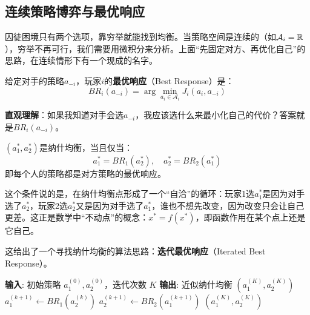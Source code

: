 \subsection{连续策略博弈与最优响应}

囚徒困境只有两个选项，靠穷举就能找到均衡。当策略空间是连续的（如$\mathcal{A}_i = \mathbb{R}$），穷举不再可行，我们需要用微积分来分析。上面“先固定对方、再优化自己”的思路，在连续情形下有一个现成的名字。

\begin{definition}[最优响应]
给定对手的策略$a_{-i}$，玩家$i$的\textbf{最优响应}（Best Response）是：
\begin{equation}
    BR_i(a_{-i}) = \arg\min_{a_i \in \mathcal{A}_i} J_i(a_i, a_{-i})
\end{equation}

\textbf{直观理解}：如果我知道对手会选$a_{-i}$，我应该选什么来最小化自己的代价？答案就是$BR_i(a_{-i})$。
\end{definition}

\begin{proposition}[纳什均衡的不动点特征]
$(a_1^*, a_2^*)$是纳什均衡，当且仅当：
\begin{equation}
    a_1^* = BR_1(a_2^*), \quad a_2^* = BR_2(a_1^*)
\end{equation}
即每个人的策略都是对方策略的最优响应。
\end{proposition}

\begin{remark}[不动点的直观含义]
这个条件说的是，在纳什均衡点形成了一个“自洽”的循环：玩家1选$a_1^*$是因为对手选了$a_2^*$，玩家2选$a_2^*$又是因为对手选了$a_1^*$，谁也不想先改变，因为改变只会让自己更差。这正是数学中“不动点”的概念：$x^* = f(x^*)$，即函数作用在某个点上还是它自己。
\end{remark}

这给出了一个寻找纳什均衡的算法思路：\textbf{迭代最优响应}（Iterated Best Response）。

\begin{algorithm}
\caption{迭代最优响应（伪代码）}
\begin{algorithmic}[1]
\State \textbf{输入}: 初始策略 $a_1^{(0)}, a_2^{(0)}$，迭代次数 $K$
\State \textbf{输出}: 近似纳什均衡 $(a_1^{(K)}, a_2^{(K)})$
    \State $a_1^{(k+1)} \leftarrow BR_1(a_2^{(k)})$ 
    \State $a_2^{(k+1)} \leftarrow BR_2(a_1^{(k+1)})$ 
\EndFor
\State \Return $(a_1^{(K)}, a_2^{(K)})$
\end{algorithmic}
\end{algorithm}


